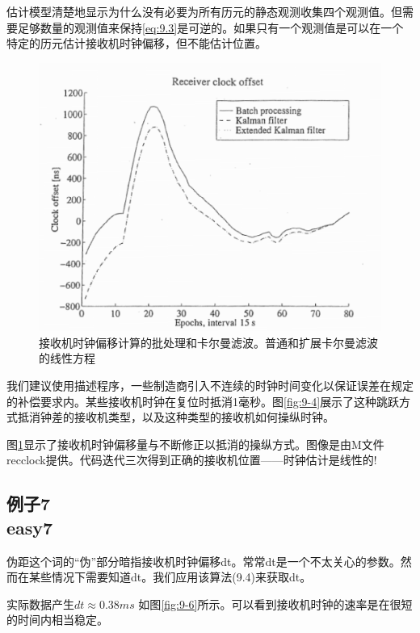 	估计模型清楚地显示为什么没有必要为所有历元的静态观测收集四个观测值。但需要足够数量的观测值来保持\ref{eq:9.3}是可逆的。如果只有一个观测值是可以在一个特定的历元估计接收机时钟偏移，但不能估计位置。
	\begin{figure}
		\centering
		\includegraphics[width=0.7\linewidth]{TeX_files/Part03/chapter09/image/9-5}
		\caption{接收机时钟偏移计算的批处理和卡尔曼滤波。普通和扩展卡尔曼滤波的线性方程}
		\label{fig:9-5}
	\end{figure}
	
	我们建议使用描述程序，一些制造商引入不连续的时钟时间变化以保证误差在规定的补偿要求内。某些接收机时钟在复位时抵消1毫秒。图\ref{fig:9-4}展示了这种跳跃方式抵消钟差的接收机类型，以及这种类型的接收机如何操纵时钟。
	
	图\ref{fig:9-5}显示了接收机时钟偏移量与不断修正以抵消的操纵方式。图像是由M文件recclock提供。代码迭代三次得到正确的接收机位置——时钟估计是线性的!
	
	\subsection[例子7]{例子7\\easy7}\label{subsec:easy7}
	伪距这个词的“伪”部分暗指接收机时钟偏移dt。常常dt是一个不太关心的参数。然而在某些情况下需要知道dt。我们应用该算法(9.4)来获取dt。
	
	实际数据产生$dt\approx0.38 ms$ 如图\ref{fig:9-6}所示。可以看到接收机时钟的速率是在很短的时间内相当稳定。
